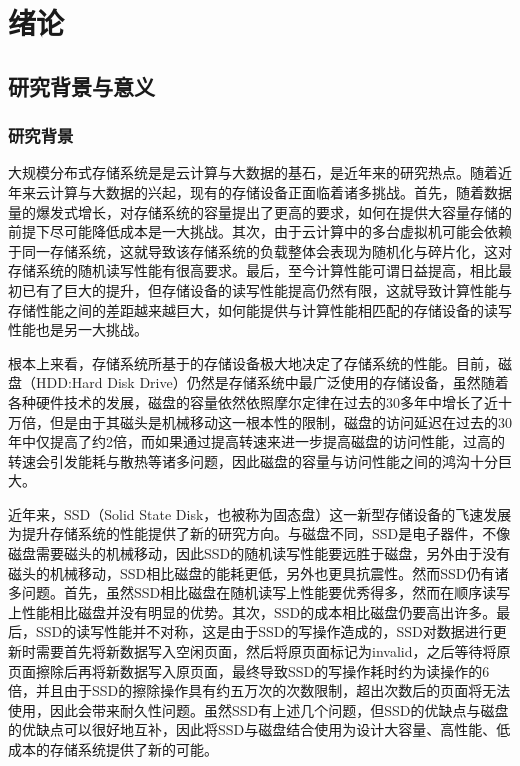 
\chapter{绪论}
\label{chap:intro}

\section{研究背景与意义}

\subsection{研究背景}
\label{sec:backgrounds}

大规模分布式存储系统是是云计算与大数据的基石，是近年来的研究热点。随着近年来云计算与大数据的兴起，现有的存储设备正面临着诸多挑战。首先，随着数据量的爆发式增长，对存储系统的容量提出了更高的要求，如何在提供大容量存储的前提下尽可能降低成本是一大挑战\cite{gray2003next}。其次，由于云计算中的多台虚拟机可能会依赖于同一存储系统，这就导致该存储系统的负载整体会表现为随机化与碎片化，这对存储系统的随机读写性能有很高要求。最后，至今计算性能可谓日益提高，相比最初已有了巨大的提升，但存储设备的读写性能提高仍然有限，这就导致计算性能与存储性能之间的差距越来越巨大\cite{morris2003evolution}，如何能提供与计算性能相匹配的存储设备的读写性能也是另一大挑战。

根本上来看，存储系统所基于的存储设备极大地决定了存储系统的性能。目前，磁盘（HDD:Hard Disk Drive）仍然是存储系统中最广泛使用的存储设备，虽然随着各种硬件技术的发展，磁盘的容量依然依照摩尔定律\cite{schirle1996history}在过去的30多年中增长了近十万倍，但是由于其磁头是机械移动这一根本性的限制，磁盘的访问延迟在过去的30年中仅提高了约2倍，而如果通过提高转速来进一步提高磁盘的访问性能，过高的转速会引发能耗与散热等诸多问题，因此磁盘的容量与访问性能之间的鸿沟十分巨大。

近年来，SSD（Solid State Disk，也被称为固态盘）这一新型存储设备的飞速发展为提升存储系统的性能提供了新的研究方向。与磁盘不同，SSD是电子器件，不像磁盘需要磁头的机械移动，因此SSD的随机读写性能要远胜于磁盘，另外由于没有磁头的机械移动，SSD相比磁盘的能耗更低，另外也更具抗震性。然而SSD仍有诸多问题。首先，虽然SSD相比磁盘在随机读写上性能要优秀得多，然而在顺序读写上性能相比磁盘并没有明显的优势。其次，SSD的成本相比磁盘仍要高出许多。最后，SSD的读写性能并不对称，这是由于SSD的写操作造成的，SSD对数据进行更新时需要首先将新数据写入空闲页面，然后将原页面标记为invalid，之后等待将原页面擦除后再将新数据写入原页面，最终导致SSD的写操作耗时约为读操作的6倍，并且由于SSD的擦除操作具有约五万次的次数限制，超出次数后的页面将无法使用，因此会带来耐久性问题。虽然SSD有上述几个问题，但SSD的优缺点与磁盘的优缺点可以很好地互补，因此将SSD与磁盘结合使用为设计大容量、高性能、低成本的存储系统提供了新的可能。

